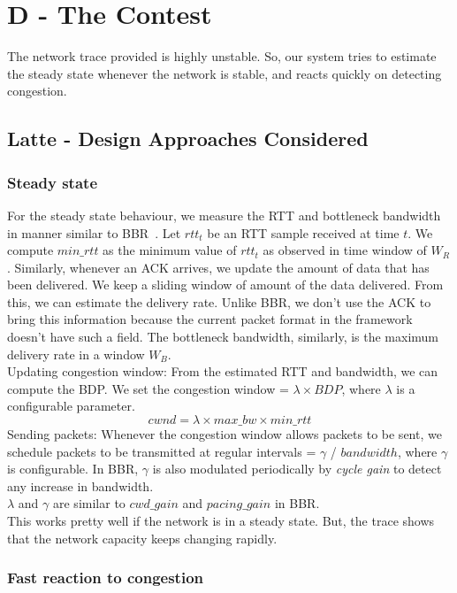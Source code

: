 \documentclass{article}
\begin{document}
\clearpage
\section{D - The Contest}

The network trace provided is highly unstable. So, our system tries to
estimate the steady state whenever the network is stable, and reacts
quickly on detecting congestion.\\

\subsection{Latte - Design Approaches Considered}
\subsubsection{Steady state}
For the steady state behaviour, we measure the RTT and bottleneck
bandwidth in manner similar to BBR~\cite{bbr}. Let $rtt_t$ be an RTT
sample received at time $t$. We compute $min\_rtt$ as the minimum
value of $rtt_t$ as observed in time window of $W_R$. Similarly,
whenever an ACK arrives, we update the amount of data that has been
delivered. We keep a sliding window of amount of the data delivered.
From this, we can estimate the delivery rate. Unlike BBR, we don't
use the ACK to bring this information because the current packet
format in the framework doesn't have such a field. The bottleneck
bandwidth, similarly, is the maximum delivery rate in a window
$W_B$.\\

Updating congestion window: From the estimated RTT and bandwidth,
we can compute the BDP. We set the congestion window = $\lambda \times
BDP$, where $\lambda$ is a configurable parameter.\\
\[
cwnd = \lambda \times max\_bw \times min\_rtt
\]
Sending packets: Whenever the congestion window allows packets to be
sent, we schedule packets to be transmitted at regular intervals =
$\gamma$ / $bandwidth$, where $\gamma$ is configurable.  In BBR,
$\gamma$ is also modulated periodically by \textit{cycle gain} to
detect any increase in bandwidth.\\
$\lambda$ and $\gamma$ are similar to $cwd\_gain$ and $pacing\_gain$
in BBR.\\
This works pretty well if the network is in a steady state. But, the
trace shows that the network capacity keeps changing rapidly.


\subsubsection{Fast reaction to congestion}
\end{document}
